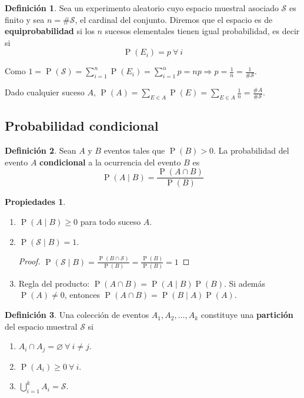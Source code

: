 \documentclass[11pt]{article}
\theoremstyle{plain}
\theoremstyle{definition}
\newtheorem*{defi}{Definición}
\newtheorem*{props}{Propiedades}
\theoremstyle{remark}
\newcommand{\deft}[1]{\textbf{#1}}  %
\newcommand{\proba}{\ensuremath{\operatorname{P}}}  %
\newcommand{\espm}[0]{\ensuremath{\mathcal{S}}}  %
\newcommand{\foralle}{\ensuremath{\forall \ }}  %
\begin{document}
  \begin{defi}
    Sea un experimento aleatorio cuyo espacio muestral asociado $\espm$ es finito y sea $n = \# \espm$, el cardinal del conjunto. Diremos que el espacio es de \deft{equiprobabilidad} si los $n$ sucesos elementales tienen igual probabilidad, es decir si
    \[ \proba(E_i) = p \ \foralle i \]
  \end{defi}
  
  Como $1 = \proba(\espm) = \sum_{i=1}^n \proba(E_i) = \sum_{i=1}^n p = np \Rightarrow p = \frac{1}{n} = \frac{1}{\#\espm}$.
  
  Dado cualquier suceso $A$, $\proba(A) = \sum_{E \in A} \proba(E) = \sum_{E \in A} \frac{1}{n} = \frac{\#A}{\#\espm}$.

  \subsection{Probabilidad condicional}
    \begin{defi}
      Sean $A$ y $B$ eventos tales que $\proba(B) > 0$. La probabilidad del evento $A$ \deft{condicional} a la ocurrencia del evento $B$ es
      \[ \proba(A \mid B) = \frac{\proba(A \cap B)}{\proba(B)} \]
    \end{defi}

    \begin{props} \ 
      \begin{enumerate}
        \item $\proba(A \mid B) \geq 0$ para todo suceso $A$.
        \item $\proba(\espm \mid B) = 1$.
        \begin{proof}
          $\proba(\espm \mid B) = \frac{\proba(B \cap \espm)}{\proba(B)} = \frac{\proba(B)}{\proba(B)} = 1$
        \end{proof}
        \item Regla del producto: $\proba(A \cap B) = \proba(A \mid B) \proba(B)$. Si además $\proba(A) \neq 0$, entonces $\proba(A \cap B) = \proba(B \mid A) \proba(A)$.
      \end{enumerate}
    \end{props}

    \begin{defi}
      Una colección de eventos $A_1, A_2, \dots, A_k$ constituye una \deft{partición} del espacio muestral $\espm$ si
      \begin{enumerate}
        \item $A_i \cap A_j = \varnothing \ \foralle i \neq j$.
        \item $\proba(A_i) \geq 0 \ \foralle i$.
        \item $\bigcup_{i=1}^k A_i = \espm$.
      \end{enumerate}
    \end{defi}
\end{document}
